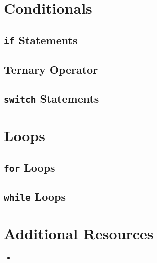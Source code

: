 \section{Conditionals}

\subsection{\texttt{if} Statements}

\subsection{Ternary Operator}

\subsection{\texttt{switch} Statements}


\section{Loops}

\subsection{\texttt{for} Loops}

\subsection{\texttt{while} Loops}


\section{Additional Resources}

\begin{itemize}[leftmargin=*]
    \item %
\end{itemize}
